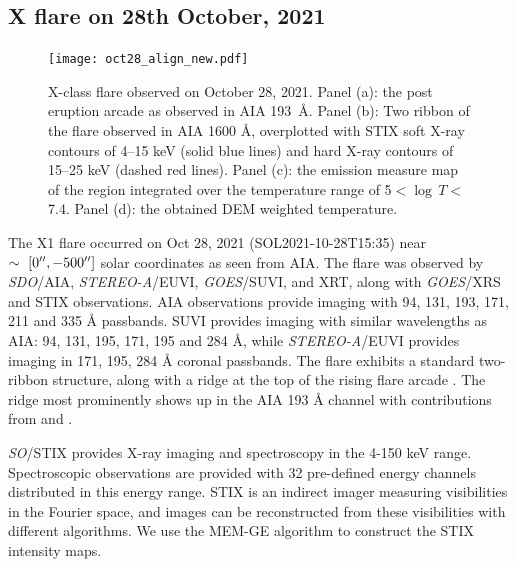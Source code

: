 \subsection{X flare on 28th October, 2021}\label{sec:x1-obs}
\begin{figure}[ht!]
    \centering
    \texttt{[image: oct28\_align\_new.pdf]}
    \caption[Observation of the X-class flare on October 28, 2021.]{X-class flare observed on October 28, 2021. Panel (a): the post eruption arcade as observed in AIA 193~{\AA}. Panel (b): Two ribbon of the flare observed in AIA 1600 {\AA}, overplotted with STIX soft X-ray contours of 4{--}15 keV (solid blue lines) and hard X-ray contours of 15{--}25 keV (dashed red lines). Panel (c): the emission measure map of the region integrated over the temperature range of 5$<\log\,T<$7.4. Panel (d): the obtained DEM weighted temperature.}
    \label{fig:flare}
\end{figure}
The X1 flare occurred on Oct 28, 2021 (SOL2021-10-28T15:35) near $\sim~[0\hbox{$^{\prime\prime}$},-500\hbox{$^{\prime\prime}$}]$ solar coordinates as seen from AIA. The flare was observed by {\it SDO}/AIA, {\it STEREO-A}/EUVI, {\it GOES}/SUVI, and XRT, along with {\it GOES}/XRS and STIX observations. AIA observations provide imaging with 94, 131, 193, 171, 211 and 335 {\AA} passbands. SUVI provides imaging with similar wavelengths as AIA: 94, 131, 195, 171, 195 and 284 {\AA}, while {\it STEREO-A}/EUVI provides imaging in 171, 195, 284 {\AA} coronal passbands. The flare exhibits a standard two-ribbon structure, along with a ridge at the top of the rising flare arcade \citep{longcope22}. The ridge most prominently shows up in the AIA 193 {\AA} channel with contributions from  and . %

{\it SO}/STIX provides X-ray imaging and spectroscopy in the 4-150 keV range. Spectroscopic observations are provided with 32 pre-defined energy channels distributed in this energy range. STIX is an indirect imager measuring visibilities in the Fourier space, and images can be reconstructed from these visibilities with different algorithms. We use the MEM-GE algorithm \citep{massa20} to construct the STIX intensity maps.

